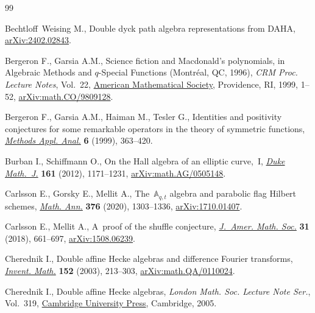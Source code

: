 \documentclass[pdftex]{sigma}
\numberwithin{equation}{section}
\theoremstyle{definition}
\begin{document}
\begin{thebibliography}{99}
\footnotesize\itemsep=0pt

Bechtloff~Weising M., Double dyck path algebra representations from {DAHA},
 \href{http://arxiv.org/abs/2402.02843}{arXiv:2402.02843}.

Bergeron F., Garsia A.M., Science fiction and {M}acdonald's polynomials, in
 Algebraic {M}ethods and {$q$}\nobreakdash-{S}pecial {F}unctions ({M}ontr\'eal, {QC},
 1996), \textit{CRM Proc. Lecture Notes}, Vol.~22,
 \href{https://doi.org/10.1090/crmp/022/01}{American Mathematical Society},
 Providence, RI, 1999, 1--52,
 \href{http://arxiv.org/abs/math.CO/9809128}{arXiv:math.CO/9809128}.

Bergeron F., Garsia A.M., Haiman M., Tesler G., Identities and positivity
 conjectures for some remarkable operators in the theory of symmetric
 functions, \href{https://doi.org/10.4310/MAA.1999.v6.n3.a7}{\textit{Methods
 Appl. Anal.}} \textbf{6} (1999), 363--420.

Burban I., Schiffmann O., On the {H}all algebra of an elliptic curve,~{I},
 \href{https://doi.org/10.1215/00127094-1593263}{\textit{Duke Math.~J.}}
 \textbf{161} (2012), 1171--1231,
 \href{http://arxiv.org/abs/math/0505148}{arXiv:math.AG/0505148}.

Carlsson E., Gorsky E., Mellit A., The~{$\mathbb{A}_{q,t}$} algebra and
 parabolic flag {H}ilbert schemes,
 \href{https://doi.org/10.1007/s00208-019-01898-1}{\textit{Math. Ann.}}
 \textbf{376} (2020), 1303--1336,
 \href{http://arxiv.org/abs/1710.01407}{arXiv:1710.01407}.

Carlsson E., Mellit A., A~proof of the shuffle conjecture,
 \href{https://doi.org/10.1090/jams/893}{\textit{J.~Amer. Math. Soc.}}
 \textbf{31} (2018), 661--697,
 \href{http://arxiv.org/abs/1508.06239}{arXiv:1508.06239}.

Cherednik I., Double affine {H}ecke algebras and difference {F}ourier
 transforms, \href{https://doi.org/10.1007/s00222-002-0240-0}{\textit{Invent.
 Math.}} \textbf{152} (2003), 213--303,
 \href{http://arxiv.org/abs/math.QA/0110024}{arXiv:math.QA/0110024}.

Cherednik I., Double affine {H}ecke algebras, \textit{London Math. Soc. Lecture
 Note Ser.}, Vol.~319,
 \href{https://doi.org/10.1017/CBO9780511546501}{Cambridge University Press},
 Cambridge, 2005.


\end{thebibliography}
\end{document}
